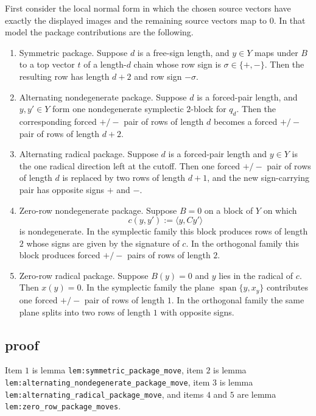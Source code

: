 \documentclass[
]{article}
\providecommand{\tightlist}{%
  \setlength{\itemsep}{0pt}\setlength{\parskip}{0pt}}
\begin{document}
First consider the local normal form in which the chosen source vectors
have exactly the displayed images and the remaining source vectors map
to \(0\). In that model the package contributions are the following.

\begin{enumerate}
\def\labelenumi{\arabic{enumi}.}
\tightlist
\item
  Symmetric package. Suppose \(d\) is a free-sign length, and \(y\in Y\)
  maps under \(B\) to a top vector \(t\) of a length-\(d\) chain whose
  row sign is \(\sigma\in\{+,-\}\). Then the resulting row has length
  \(d+2\) and row sign \(-\sigma\).
\item
  Alternating nondegenerate package. Suppose \(d\) is a forced-pair
  length, and \(y,y'\in Y\) form one nondegenerate symplectic
  \(2\)-block for \(q_d\). Then the corresponding forced \(+/-\) pair of
  rows of length \(d\) becomes a forced \(+/-\) pair of rows of length
  \(d+2\).
\item
  Alternating radical package. Suppose \(d\) is a forced-pair length and
  \(y\in Y\) is the one radical direction left at the cutoff. Then one
  forced \(+/-\) pair of rows of length \(d\) is replaced by two rows of
  length \(d+1\), and the new sign-carrying pair has opposite signs
  \(+\) and \(-\).
\item
  Zero-row nondegenerate package. Suppose \(B=0\) on a block of \(Y\) on
  which \[
  c(y,y'):=\langle y,Cy'\rangle
  \] is nondegenerate. In the symplectic family this block produces rows
  of length \(2\) whose signs are given by the signature of \(c\). In
  the orthogonal family this block produces forced \(+/-\) pairs of rows
  of length \(2\).
\item
  Zero-row radical package. Suppose \(B(y)=0\) and \(y\) lies in the
  radical of \(c\). Then \(x(y)=0\). In the symplectic family the plane
  \(\operatorname{span}\{y,x_y\}\) contributes one forced \(+/-\) pair
  of rows of length \(1\). In the orthogonal family the same plane
  splits into two rows of length \(1\) with opposite signs.
\end{enumerate}

\subsection{proof}\label{proof-10}

Item \(1\) is lemma \texttt{lem:symmetric\_package\_move}, item \(2\) is
lemma \texttt{lem:alternating\_nondegenerate\_package\_move}, item \(3\)
is lemma \texttt{lem:alternating\_radical\_package\_move}, and items
\(4\) and \(5\) are lemma \texttt{lem:zero\_row\_package\_moves}.
\end{document}
